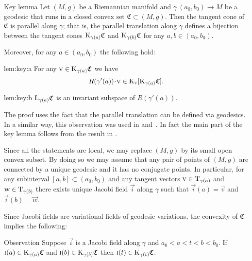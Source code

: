 \documentclass[a4paper,10pt]{article}
\begin{document}
\begin{thm}{Key lemma}\label{lem:key}
Let $(M,g)$ be a Riemannian manifold and $\gamma\:(a_0,b_0)\to M$ be a geodesic that runs in a closed convex set $\mathfrak{C}\subset (M,g)$.
Then the tangent cone of $\mathfrak{C}$ is parallel along $\gamma$; that is, the parallel translation along $\gamma$ defines a bijection between the tangent cones $\mathrm{K}_{\gamma(a)}\mathfrak{C}$ and $\mathrm{K}_{\gamma(b)}\mathfrak{C}$ for any $a,b \in (a_0,b_0)$.

Moreover, for any $a\in (a_0,b_0)$ the following hold:
\begin{subthm}{lem:key:a} %
For any $\text{\sc{v}}\in \mathrm{K}_{\gamma(a)}\mathfrak{C}$ we have
\[R(\gamma'(a))\cdot \vec{v}\in \K_\vec{v}[\K_{\gamma(a)}\mathfrak{C}].\]
\end{subthm}

\begin{subthm}{lem:key:b} 
$\mathrm{L}_{\gamma(a)}\mathfrak{C}$ is an invariant subspace of $R(\gamma'(a))$.
\end{subthm}

\end{thm}

The proof uses the fact that the parallel translation can be defined via geodesics.
In a similar way, this observation was used in \cite[Section 13]{Ber-Nik} and~\cite{Petruninpar}.
In fact the main part of the key lemma follows from the result in \cite{Petruninpar}.

Since all the statements are local, we may replace $(M,g)$ by its small open convex subset.
By doing so we may assume that any pair of points of $(M,g)$ are connected by a unique geodesic and it has no conjugate points.
In particular, for any subinterval $[a,b]\subset (a_0,b_0)$ and any tangent vectors $\text{\sc{v}} \in \mathrm{T}_{\gamma (a)}$ and $\text{\sc{w}} \in \mathrm{T}_{\gamma (b)}$ there exists unique Jacobi field $\vec{i}$ along $\gamma$ such that $\vec{i}(a)=\vec{v}$ and $\vec{i}(b)=\vec{w}$.

Since Jacobi fields are variational fields of geodesic variations, the convexity of $\mathfrak{C}$ implies the following: 

\begin{thm}{Observation}
Suppose $\vec{i}$ is a Jacobi field along %
$\gamma$ and $a_0<a<t<b<b_0$.
If 
$\text{\sc{i}}(a)\in \mathrm{K}_{\gamma(a)}\mathfrak{C}$ and $\text{\sc{i}}(b)\in \mathrm{K}_{\gamma(b)}\mathfrak{C}$
then $\text{\sc{i}}(t)\in \mathrm{K}_{\gamma(t)}\mathfrak{C}$.
\end{thm}%
\end{document}
